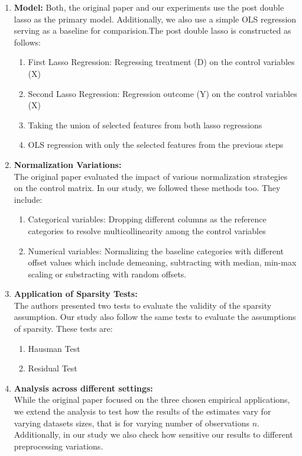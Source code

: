 \begin{enumerate}
    \item \textbf{Model:} Both, the original paper and our experiments use the post double lasso as the primary model. Additionally, we also use a simple OLS regression serving as a baseline for comparision.The post double lasso is constructed as follows:
    \begin{enumerate}
        \item First Lasso Regression: Regressing treatment (D) on the control variables (X)
        \item Second Lasso Regression: Regression outcome (Y) on the control variables (X)
        \item Taking the union of selected features from both lasso regressions
        \item OLS regression with only the selected features from the previous steps
    \end{enumerate}
    
    \item \textbf{Normalization Variations:}\\
    The original paper evaluated the impact of various normalization strategies on the control matrix. In our study, we followed these methods too. They include:
    \begin{enumerate}
        \item Categorical variables: Dropping different columns as the reference categories to resolve multicollinearity among the control variables
        \item Numerical variables: Normalizing the baseline categories with different offset values which include demeaning, subtracting with median, min-max scaling or substracting with random offsets. 
    \end{enumerate}

    \item \textbf{Application of Sparsity Tests:}\\
    The authors presented two tests to evaluate the validity of the sparsity assumption. Our study also follow the same tests to evaluate the assumptions of sparsity. These tests are:
    \begin{enumerate}
        \item Hausman Test
        \item Residual Test
    \end{enumerate}

    \item \textbf{Analysis across different settings:}\\
     While the original paper focused on the three chosen empirical applications, we extend the analysis to test how the results of the estimates vary for varying datasets sizes, that is for varying number of observations $n$. Additionally, in our study we also check how sensitive our results to different preprocessing variations. 
        

    
\end{enumerate}